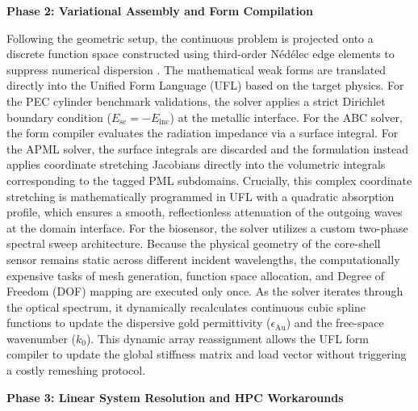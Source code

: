 \vspace{12pt}

\noindent\textbf{Phase 2: Variational Assembly and Form Compilation}

\vspace{6pt}

Following the geometric setup, the continuous problem is projected onto a discrete function space constructed using third-order Nédélec edge elements to suppress numerical dispersion \citep{Melenk2010}. The mathematical weak forms are translated directly into the Unified Form Language (UFL) based on the target physics. For the PEC cylinder benchmark validations, the solver applies a strict Dirichlet boundary condition ($E_{\text{sc}} = -E_{\text{inc}}$) at the metallic interface. For the ABC solver, the form compiler evaluates the radiation impedance via a surface integral. For the APML solver, the surface integrals are discarded and the formulation instead applies coordinate stretching Jacobians directly into the volumetric integrals corresponding to the tagged PML subdomains. Crucially, this complex coordinate stretching is mathematically programmed in UFL with a quadratic absorption profile, which ensures a smooth, reflectionless attenuation of the outgoing waves at the domain interface. For the biosensor, the solver utilizes a custom two-phase spectral sweep architecture. Because the physical geometry of the core-shell sensor remains static across different incident wavelengths, the computationally expensive tasks of mesh generation, function space allocation, and Degree of Freedom (DOF) mapping are executed only once. As the solver iterates through the optical spectrum, it dynamically recalculates continuous cubic spline functions to update the dispersive gold permittivity ($\epsilon_{\text{Au}}$) and the free-space wavenumber ($k_0$). This dynamic array reassignment allows the UFL form compiler to update the global stiffness matrix and load vector without triggering a costly remeshing protocol.

\vspace{12pt}

\noindent\textbf{Phase 3: Linear System Resolution and HPC Workarounds}

\vspace{6pt}

